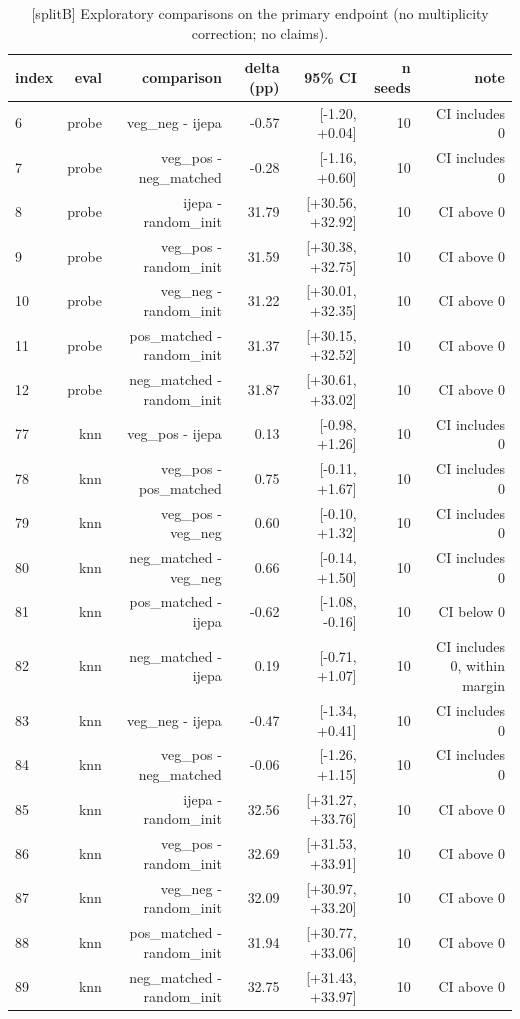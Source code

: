 \begin{table}[t]
\centering
\small
\caption{[splitB] Exploratory comparisons on the primary endpoint (no multiplicity correction; no claims).}
\label{tab:exploratory_comparisons}
\begin{tabular}{lrrrrrr}
\toprule
index & eval & comparison & delta (pp) & 95\% CI & n seeds & note \\
\midrule
6 & probe & veg\_neg - ijepa & -0.57 & [-1.20, +0.04] & 10 & CI includes 0 \\
7 & probe & veg\_pos - neg\_matched & -0.28 & [-1.16, +0.60] & 10 & CI includes 0 \\
8 & probe & ijepa - random\_init & 31.79 & [+30.56, +32.92] & 10 & CI above 0 \\
9 & probe & veg\_pos - random\_init & 31.59 & [+30.38, +32.75] & 10 & CI above 0 \\
10 & probe & veg\_neg - random\_init & 31.22 & [+30.01, +32.35] & 10 & CI above 0 \\
11 & probe & pos\_matched - random\_init & 31.37 & [+30.15, +32.52] & 10 & CI above 0 \\
12 & probe & neg\_matched - random\_init & 31.87 & [+30.61, +33.02] & 10 & CI above 0 \\
77 & knn & veg\_pos - ijepa & 0.13 & [-0.98, +1.26] & 10 & CI includes 0 \\
78 & knn & veg\_pos - pos\_matched & 0.75 & [-0.11, +1.67] & 10 & CI includes 0 \\
79 & knn & veg\_pos - veg\_neg & 0.60 & [-0.10, +1.32] & 10 & CI includes 0 \\
80 & knn & neg\_matched - veg\_neg & 0.66 & [-0.14, +1.50] & 10 & CI includes 0 \\
81 & knn & pos\_matched - ijepa & -0.62 & [-1.08, -0.16] & 10 & CI below 0 \\
82 & knn & neg\_matched - ijepa & 0.19 & [-0.71, +1.07] & 10 & CI includes 0, within margin \\
83 & knn & veg\_neg - ijepa & -0.47 & [-1.34, +0.41] & 10 & CI includes 0 \\
84 & knn & veg\_pos - neg\_matched & -0.06 & [-1.26, +1.15] & 10 & CI includes 0 \\
85 & knn & ijepa - random\_init & 32.56 & [+31.27, +33.76] & 10 & CI above 0 \\
86 & knn & veg\_pos - random\_init & 32.69 & [+31.53, +33.91] & 10 & CI above 0 \\
87 & knn & veg\_neg - random\_init & 32.09 & [+30.97, +33.20] & 10 & CI above 0 \\
88 & knn & pos\_matched - random\_init & 31.94 & [+30.77, +33.06] & 10 & CI above 0 \\
89 & knn & neg\_matched - random\_init & 32.75 & [+31.43, +33.97] & 10 & CI above 0 \\
\bottomrule
\end{tabular}
\end{table}
